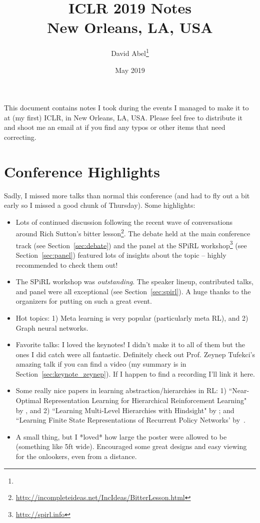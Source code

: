 \documentclass[11pt]{article}
\title{ICLR 2019 Notes \\ \Large{New Orleans, LA, USA}}
\author{David Abel\footnote{\durl{http://david-abel.github.io}} \\ \durl{david_abel@brown.edu}}
\date{May 2019}
\begin{document}
\maketitle
\tableofcontents
\newpage


This document contains notes I took during the events I managed to make it to at (my first) ICLR, in New Orleans, LA, USA. Please feel free to distribute it and shoot me an email at  if you find any typos or other items that need correcting. 


\section{Conference Highlights}

Sadly, I missed more talks than normal this conference (and had to fly out a bit early so I missed a good chunk of Thursday). Some highlights:
\begin{itemize}
    \item Lots of continued discussion following the recent wave of conversations around Rich Sutton's bitter lesson\footnote{\url{http://incompleteideas.net/IncIdeas/BitterLesson.html}}. The debate held at the main conference track (see Section~\ref{sec:debate}) and the panel at the SPiRL workshop\footnote{\url{http://spirl.info}} (see Section~\ref{sec:panel}) featured lots of insights about the topic -- highly recommended to check them out!
    \item The SPiRL workshop was {\it outstanding}. The speaker lineup, contributed talks, and panel were all exceptional (see Section~\ref{sec:spirl}). A huge thanks to the organizers for putting on such a great event.
    \item Hot topics: 1) Meta learning is very popular (particularly meta RL), and 2) Graph neural networks.
    \item Favorite talks: I loved the keynotes! I didn't make it to all of them but the ones I did catch were all fantastic. Definitely check out Prof. Zeynep Tufekci's amazing talk if you can find a video (my summary is in Section~\ref{sec:keynote_zeynep}). If I happen to find a recording I'll link it here.
    \item Some really nice papers in learning abstraction/hierarchies in RL: 1) ``Near-Optimal Representation Learning for Hierarchical Reinforcement Learning" by \citet{nachum2018near}, and 2) ``Learning Multi-Level Hierarchies with Hindsight" by \citet{levy2018learning}; and ``Learning Finite State Representations of Recurrent Policy Networks' by~\citet{koul2018learning}.
    \item A small thing, but I *loved* how large the poster were allowed to be (something like 5ft wide). Encouraged some great designs and easy viewing for the onlookers, even from a distance.
\end{itemize}
\end{document}
